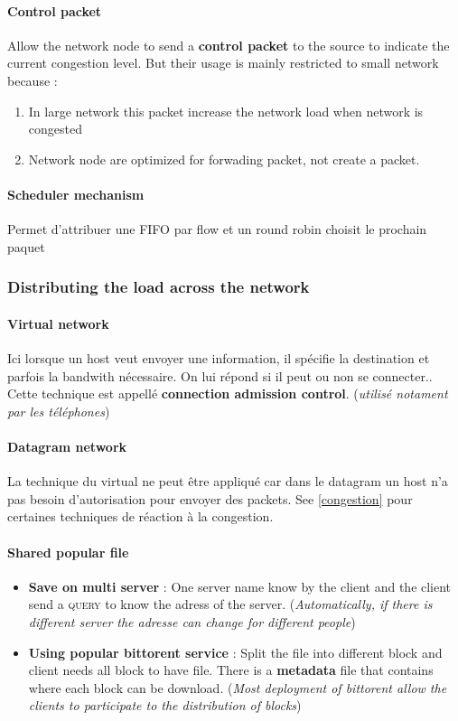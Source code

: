 \paragraph{Control packet}
Allow the network node to send a \textbf{control packet} to the source to indicate
the current congestion level. But their usage is mainly restricted to small network because :
\begin{enumerate}
    \item In large network this packet increase the network load when network is congested
    \item Network node are optimized for forwading packet, not create a packet.
\end{enumerate}

\paragraph{Scheduler mechanism}
Permet d'attribuer une FIFO par flow et un round robin choisit le prochain paquet


\subsubsection{Distributing the load across the network}

\paragraph{Virtual network}
Ici lorsque un host veut envoyer une information, il spécifie la destination et parfois la
bandwith nécessaire. On lui répond si il peut ou non se connecter.. Cette technique
est appellé \textbf{connection admission control}. (\textit{utilisé notament par les téléphones})

\paragraph{Datagram network}
La technique du virtual ne peut être appliqué car dans le datagram un host n'a pas
besoin d'autorisation pour envoyer des packets. See \ref{congestion} pour
certaines techniques de réaction à la congestion.

\paragraph{Shared popular file}
\begin{itemize}
    \item \textbf{Save on multi server} : One server name know by the client and the
        client send a \textsc{query} to know the adress of the server. (\textit{Automatically,
            if there is different server the adresse can change for different people})
    \item \textbf{Using popular bittorent service} : Split the file into different block
        and client needs all block to have file. There is a \textbf{metadata} file that
        contains where each block can be download.
        (\textit{Most deployment of bittorent allow the clients to participate
        to the distribution of blocks})
\end{itemize}

